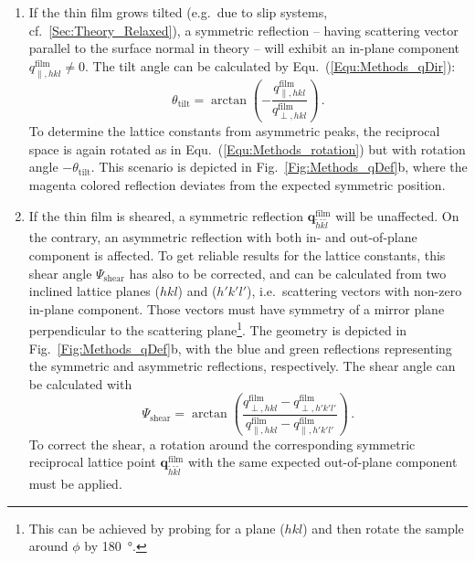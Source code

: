 \begin{enumerate}
    \item If the thin film grows tilted (e.g.\ due to slip systems, cf.~\ref{Sec:Theory_Relaxed}), a symmetric reflection -- having scattering vector parallel to the surface normal in theory -- will exhibit an in-plane component $q_{\parallel,hkl}^\mathrm{film}\neq0$.
    The tilt angle can be calculated by Equ.~(\ref{Equ:Methods_qDir}): 
    \begin{equation}
        \theta_\mathrm{tilt}=\arctan\left(-\frac{q_{\parallel,hkl}^\mathrm{film}}{q_{\perp,hkl}^\mathrm{film}}\right)\,.
    \end{equation}
    To determine the lattice constants from asymmetric peaks, the reciprocal space is again rotated as in Equ.~(\ref{Equ:Methods_rotation}) but with rotation angle $-\theta_\mathrm{tilt}$.
    This scenario is depicted in Fig.~\ref{Fig:Methods_qDef}b, where the magenta colored reflection deviates from the expected symmetric position.

    \item If the thin film is sheared, a symmetric reflection $\mathbf{q}_{\tilde{h}\tilde{k}\tilde{l}}^\mathrm{film}$ will be unaffected.
    On the contrary, an asymmetric reflection with both in- and out-of-plane component is affected.
    To get reliable results for the lattice constants, this shear angle $\Psi_\mathrm{shear}$ has also to be corrected, and can be calculated from two inclined lattice planes ($hkl$) and ($h'k'l'$), i.e.\ scattering vectors with non-zero in-plane component.
    Those vectors must have symmetry of a mirror plane perpendicular to the scattering plane\footnote{
        This can be achieved by probing for a plane ($hkl$) and then rotate the sample around $\phi$ by \qty{180}{\degree}.
    }.
    The geometry is depicted in Fig.~\ref{Fig:Methods_qDef}b, with the blue and green reflections representing the symmetric and asymmetric reflections, respectively.
    The shear angle can be calculated with
    \begin{equation}
        \Psi_\mathrm{shear}=\arctan\left(\frac{
            q_{\perp,hkl}^\mathrm{film}
            -q_{\perp,h'k'l'}^\mathrm{film}
        }{
            q_{\parallel,hkl}^\mathrm{film}
            -q_{\parallel,h'k'l'}^\mathrm{film}
        }\right)\,.
    \end{equation}
    To correct the shear, a rotation around the corresponding symmetric reciprocal lattice point $\mathbf{q}_{\tilde{h}\tilde{k}\tilde{l}}^\mathrm{film}$ with the same expected out-of-plane component must be applied.
\end{enumerate}